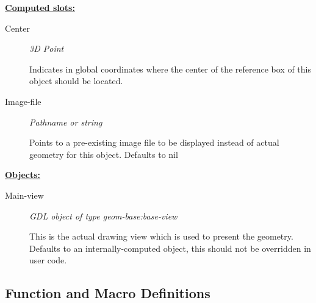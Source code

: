 \documentclass [11pt]{book}
\begin{document}
\begin{itemize}
\begin{description}
\end{description}






\textbf{
\underline{Computed slots:}}

\begin{description}

\item [Center]
\emph{3D Point}

 Indicates in global coordinates where the center of the reference
box of this object should be located.




\item [Image-file]
\emph{Pathname or string}

 Points to a pre-existing image file to be displayed instead of actual geometry for this object. Defaults to nil




\end{description}






\textbf{
\underline{Objects:}}

\begin{description}

\item [Main-view]
\emph{GDL object of type geom-base:base-view}

 This is the actual drawing view which is used to present the geometry. Defaults to an
internally-computed object, this should not be overridden in user code.




\end{description}







\end{itemize}



\subsection{Function and Macro Definitions}

\label{subsec:functionandmacrodefinitions}
\end{document}
